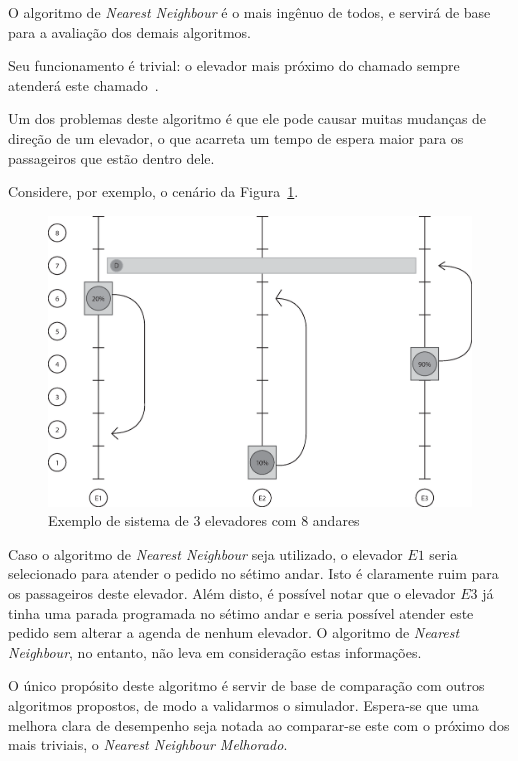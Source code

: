 O algoritmo de \textit{Nearest Neighbour} é o mais ingênuo de todos, e servirá
de base para a avaliação dos demais algoritmos.

Seu funcionamento é trivial: o elevador mais próximo do chamado sempre
atenderá este chamado~\cite{Friese20061908}.

Um dos problemas deste algoritmo é que ele pode causar muitas mudanças de
direção de um elevador, o que acarreta um tempo de espera maior para os
passageiros que estão dentro dele.

Considere, por exemplo, o cenário da Figura~\ref{fig:elevadores:nn:bad}.

\begin{figure}[htb!]
  \centering
  \includegraphics[scale=0.6]{img/elevator_example_nn_bad.eps}
  \caption{Exemplo de sistema de 3 elevadores com 8 andares}
\label{fig:elevadores:nn:bad}
\end{figure}

Caso o algoritmo de \textit{Nearest Neighbour} seja utilizado, o elevador $E1$
seria selecionado para atender o pedido no sétimo andar. Isto é claramente ruim
para os passageiros deste elevador. Além disto, é possível notar que o elevador
$E3$ já tinha uma parada programada no sétimo andar e seria possível atender
este pedido sem alterar a agenda de nenhum elevador. O algoritmo de
\textit{Nearest Neighbour}, no entanto, não leva em consideração estas informações.

O único propósito deste algoritmo é servir de base de comparação com outros
algoritmos propostos, de modo a validarmos o simulador. Espera-se que uma
melhora clara de desempenho seja notada ao comparar-se este com o próximo dos
mais triviais, o \textit{Nearest Neighbour Melhorado}.

